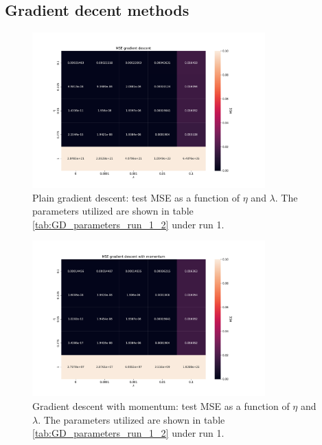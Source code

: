 \subsection{Gradient decent methods}

\begin{figure}[H]
\centering
\includegraphics[width=0.8\textwidth]{Figures/PartA/gd_MSE(eta,lmb)}
\caption{Plain gradient descent: test MSE as a function of \(\eta \) and \(\lambda \). 
The parameters utilized are shown in table \ref{tab:GD_parameters_run_1_2} under run 1.}
\label{fig:gd_MSE-eta-lmb-}
\end{figure}

\begin{figure}[H]
\centering
\includegraphics[width=0.8\textwidth]{Figures/PartA/gdm_MSE(eta,lmb)}
\caption{Gradient descent with momentum: test MSE as a function of \(\eta \) and \(\lambda \).
 The parameters utilized are shown in table \ref{tab:GD_parameters_run_1_2} under run 1.}
\label{fig:gdm_MSE-eta-lmb-}
\end{figure}

